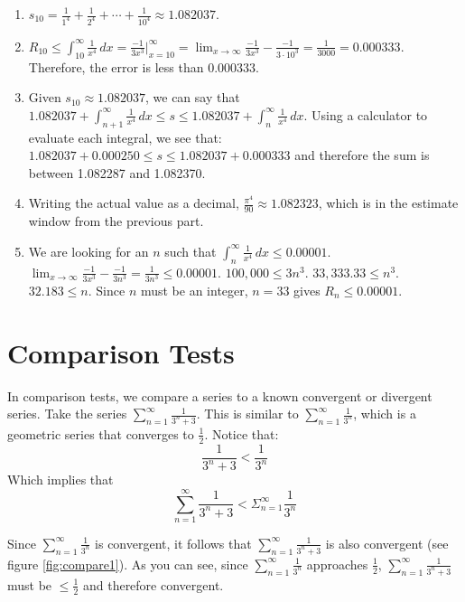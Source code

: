 \begin{Answer}[ref=remainder1]
\begin{enumerate}
\item $s_{10} = \frac{1}{1^4} + \frac{1}{2^4} + \cdots + \frac{1}{10^4} \approx 
1.082037$. 
\item $R_{10} \leq \int_{10}^\infty \frac{1}{x^4}\,dx = \frac{-1}{3x^3}|_
{x=10}^\infty = \lim_{x \to \infty} \frac{-1}{3x^3} - \frac{-1}{3 \cdot 10^3} 
= \frac{1}{3000} = 0.000333$. Therefore, the error is less than 0.000333. 
\item Given $s_{10} \approx 1.082037$, we can say that $1.082037 + \int_{n+1}^
\infty \frac{1}{x^4}\,dx \leq s \leq 1.082037 + \int_{n}^{\infty} \frac{1}{x^4}
\,dx$. Using a calculator to evaluate each integral, we see that: $1.082037 + 
0.000250 \leq s \leq 1.082037 + 0.000333$ and therefore the sum is between 
1.082287 and 1.082370. 
\item Writing the actual value as a decimal, $\frac{\pi^4}{90} \approx 
1.082323$, which is in the estimate window from the previous part. 
\item We are looking for an $n$ such that $\int_n^\infty \frac{1}{x^4}\,dx 
\leq 0.00001$. $\lim_{x \to \infty} \frac{-1}{3x^3} - \frac{-1}{3n^3} = 
\frac{1}{3n^3} \leq 0.00001$. $100,000 \leq 3n^3$. $33,333.33 \leq n^3$. 
$32.183 \leq n$. Since $n$ must be an integer, $n=33$ gives $R_n \leq 0.00001$. 
\end{enumerate}
\end{Answer}

\section{Comparison Tests}
In comparison tests, we compare a series to a known convergent or divergent 
series. Take the series $\sum_{n=1}^\infty \frac{1}{3^n + 3}$. This is 
similar to $\sum_{n=1}^\infty \frac{1}{3^n}$, which is a geometric series 
that converges to $\frac{1}{2}$. Notice that:
$$\frac{1}{3^n + 3} < \frac{1}{3^n}$$
Which implies that 
$$\sum_{n=1}^\infty \frac{1}{3^n + 3} < \Sigma_{n=1}^\infty \frac{1}{3^n}$$

Since $\sum_{n=1}^\infty \frac{1}{3^n}$ is convergent, it follows that 
$\sum_{n=1}^\infty \frac{1}{3^n + 3}$ is also convergent (see figure 
\ref{fig:compare1}). As you can see, since  $\sum_{n=1}^\infty \frac{1}{3^n}$ 
approaches $\frac{1}{2}$, $\sum_{n=1}^\infty \frac{1}{3^n + 3}$ must be $\leq 
\frac{1}{2}$ and therefore convergent. 


